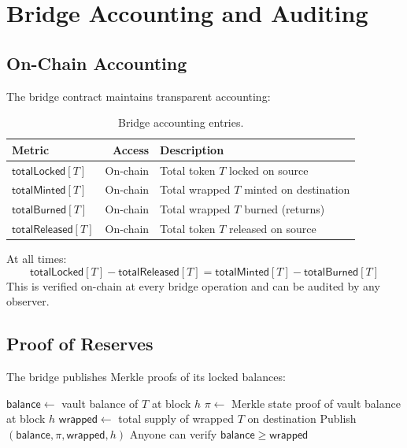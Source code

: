 \section{Bridge Accounting and Auditing}
\label{sec:audit}

\subsection{On-Chain Accounting}

The bridge contract maintains transparent accounting:

\begin{table}[H]
\centering
\caption{Bridge accounting entries.}
\label{tab:accounting}
\begin{tabular}{lrl}
\toprule
\textbf{Metric} & \textbf{Access} & \textbf{Description} \\
\midrule
$\mathsf{totalLocked}[T]$ & On-chain & Total token $T$ locked on source \\
$\mathsf{totalMinted}[T]$ & On-chain & Total wrapped $T$ minted on destination \\
$\mathsf{totalBurned}[T]$ & On-chain & Total wrapped $T$ burned (returns) \\
$\mathsf{totalReleased}[T]$ & On-chain & Total token $T$ released on source \\
\bottomrule
\end{tabular}
\end{table}

\begin{definition}
At all times:
\begin{equation}
    \mathsf{totalLocked}[T] - \mathsf{totalReleased}[T] = \mathsf{totalMinted}[T] - \mathsf{totalBurned}[T]
\end{equation}
This is verified on-chain at every bridge operation and can be audited by any observer.
\end{definition}

\subsection{Proof of Reserves}

The bridge publishes Merkle proofs of its locked balances:

\begin{algorithm}[H]
\caption{Proof of Reserves}
\label{alg:reserves}
\begin{algorithmic}[1]
    \State $\mathsf{balance} \gets$ vault balance of $T$ at block $h$
    \State $\pi \gets$ Merkle state proof of vault balance at block $h$
    \State $\mathsf{wrapped} \gets$ total supply of wrapped $T$ on destination
    \State Publish $(\mathsf{balance}, \pi, \mathsf{wrapped}, h)$
    \State Anyone can verify $\mathsf{balance} \geq \mathsf{wrapped}$
\EndProcedure
\end{algorithmic}
\end{algorithm}

